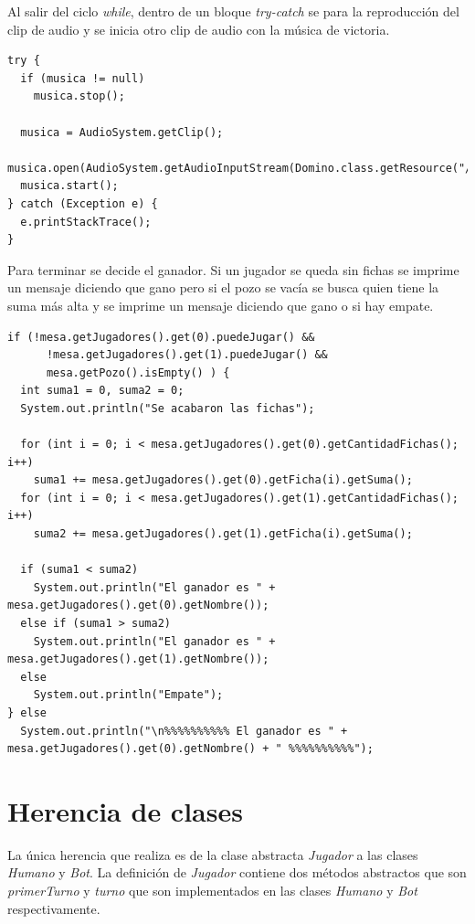 \documentclass[12pt]{article}
\begin{document}
  Al salir del ciclo \textit{while}, dentro de un bloque \textit{try-catch} se para la reproducción del clip de audio y se inicia otro clip de audio con la música de victoria. 

  \begin{lstlisting}
try {
  if (musica != null)
    musica.stop();
  
  musica = AudioSystem.getClip();
  musica.open(AudioSystem.getAudioInputStream(Domino.class.getResource("/recursos/Victoria.wav")));
  musica.start();
} catch (Exception e) {
  e.printStackTrace();
}        
  \end{lstlisting}

  Para terminar se decide el ganador. Si un jugador se queda sin fichas se imprime un mensaje diciendo que gano pero si el pozo se vacía se busca quien tiene la suma más alta y se imprime un mensaje diciendo que gano o si hay empate.

  \begin{lstlisting}
if (!mesa.getJugadores().get(0).puedeJugar() && 
      !mesa.getJugadores().get(1).puedeJugar() &&
      mesa.getPozo().isEmpty() ) {
  int suma1 = 0, suma2 = 0;
  System.out.println("Se acabaron las fichas");

  for (int i = 0; i < mesa.getJugadores().get(0).getCantidadFichas(); i++)
    suma1 += mesa.getJugadores().get(0).getFicha(i).getSuma();
  for (int i = 0; i < mesa.getJugadores().get(1).getCantidadFichas(); i++)
    suma2 += mesa.getJugadores().get(1).getFicha(i).getSuma();
  
  if (suma1 < suma2)
    System.out.println("El ganador es " + mesa.getJugadores().get(0).getNombre());
  else if (suma1 > suma2)
    System.out.println("El ganador es " + mesa.getJugadores().get(1).getNombre());
  else
    System.out.println("Empate");
} else 
  System.out.println("\n%%%%%%%%%% El ganador es " + mesa.getJugadores().get(0).getNombre() + " %%%%%%%%%%");
  \end{lstlisting}

  \section{Herencia de clases}
  La única herencia que realiza es de la clase abstracta \textit{Jugador} a las clases \textit{Humano} y \textit{Bot}. La definición de \textit{Jugador} contiene dos métodos abstractos que son \textit{primerTurno} y \textit{turno} que son implementados en las clases \textit{Humano} y \textit{Bot} respectivamente.
\end{document}
